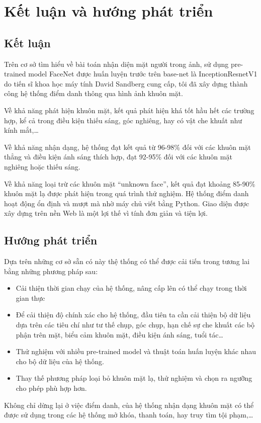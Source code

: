 \chapter{Kết luận và hướng phát triển}
\label{cha:chap4}

\section{Kết luận}
Trên cơ sở tìm hiểu về bài toán nhận diện mặt người trong ảnh, sử dụng pre-trained
model FaceNet được huấn luyện trước trên base-net là InceptionResnetV1 do
tiến sĩ khoa học máy tính David Sandberg cung cấp, tôi đã xây dựng thành công hệ
thống điểm danh thông qua hình ảnh khuôn mặt.

Về khả năng phát hiện khuôn mặt, kết quả phát hiện khá tốt hầu hết các trường hợp,
kể cả trong điều kiện thiếu sáng, góc nghiêng, hay có vật che khuất như kính mắt,…

Về khả năng nhận dạng, hệ thống đạt kết quả từ 96-98\% đối với các khuôn mặt thẳng
và điều kiện ánh sáng thích hợp, đạt 92-95\% đối với các khuôn mặt nghiêng hoặc
thiếu sáng.

Về khả năng loại trừ các khuôn mặt “unknown face”, kết quả đạt khoảng 85-90\% khuôn mặt lạ
được phát hiện trong quá trình thử nghiệm.
Hệ thống điểm danh hoạt động ổn định và mượt mà nhờ máy chủ viết bằng Python.
Giao diện được xây dựng trên nền Web là một lợi thế vì tính đơn giản và tiện lợi.

\section{Hướng phát triển}

Dựa trên những cơ sở sẵn có này thệ thống có thể được cải tiến trong
tương lai bằng những phương pháp sau:
\begin{itemize}
    \item Cải thiện thời gian chạy của hệ thống, nâng cấp lên có thể chạy trong thời gian thực
    \item Để cải thiện độ chính xác cho hệ thống, đầu tiên ta cần cải thiện bộ dữ liệu dựa trên các tiêu chí như tư thế chụp, góc chụp, hạn chế sự che khuất các bộ phận trên mặt, biểu cảm khuôn mặt, điều kiện ánh sáng, tuổi tác…
    \item Thử nghiệm với nhiều pre-trained model và thuật toán huấn luyện khác nhau cho bộ dữ liệu của hệ thống.
    \item Thay thế phương pháp loại bỏ khuôn mặt lạ, thử nghiệm và chọn ra ngưỡng cho phép phù hợp hơn.
\end{itemize}

Không chỉ dừng lại ở việc điểm danh, của hệ thống nhận dạng khuôn mặt có thể được sử dụng trong các 
hệ thống mở khóa, thanh toán, hay truy tìm tội phạm,…



